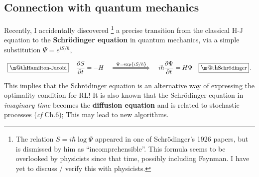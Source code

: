 \documentclass[orivec]{llncs}
\makeatletter
\newcommand{\emp}[1]{\textbf{#1}}
\renewcommand{\boxed}[1]{\fbox{\m@th$\displaystyle\scalebox{0.9}{#1}$} \,}
\makeatother
\begin{document}
\subsection{Connection with quantum mechanics}
\label{sec:quantum}

Recently, I accidentally discovered \cite{Yan2019}
\footnote{The relation $S = i \hbar \log \Psi$ appeared in one of Schr\"{o}dinger's 1926 papers, but is dismissed by him as ``incomprehensible''.  This formula seems to be overlooked by physicists since that time, possibly including Feynman.  I have yet to discuss / verify this with physicists.}
a precise transition from the classical H-J equation to the \emp{Schr\"{o}dinger equation} in quantum mechanics, via a simple substitution $\Psi = e^{i S / \hbar}$,
\begin{equation}
\begin{tikzcd}[column sep = 6em]
\boxed{\mbox{Hamilton-Jacobi}} \quad \displaystyle \frac{\partial S}{\partial t} = - H \quad
\arrow[Rightarrow, r, "$\Psi = \exp \{ i S / \hbar \} $", align=center]
& \quad \displaystyle i \hbar \frac{\partial \Psi}{\partial t} = H \Psi \quad \boxed{\mbox{Schr\"{o}dinger}} .
\end{tikzcd}
\end{equation} 
This implies that the Schr\"{o}dinger equation is an alternative way of expressing the optimality condition for RL!  It is also known that the Schr\"{o}dinger equation in \textit{imaginary time} becomes the \textbf{diffusion equation} and is related to stochastic processes (\textit{cf} \cite{Strocchi2008} Ch.6); This may lead to new algorithms.




\end{document}
